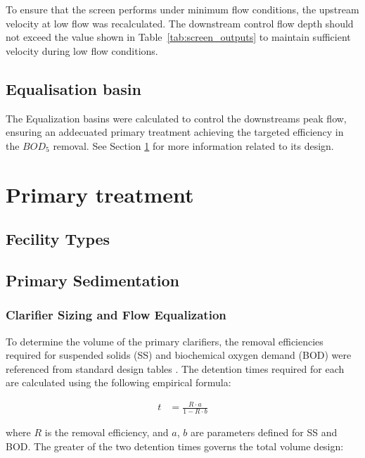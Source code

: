 \documentclass[12pt]{article}
\begin{document}
To ensure that the screen performs under minimum flow conditions, 
the upstream velocity at low flow was recalculated. The downstream control 
flow depth should not exceed the value shown in Table~\ref{tab:screen_outputs} to 
maintain sufficient velocity during low flow conditions.

\subsection{Equalisation basin}
\label{sec:equalization_basin}

The Equalization basins were calculated to control the downstreams peak flow, ensuring 
an addecuated primary treatment achieving the targeted efficiency in the $BOD_5$ 
removal. See Section \ref{sec:primary_treat} for more information related to its design.

\section{Primary treatment}
\label{sec:primary_treat}

\subsection{Fecility Types}
\label{sec:primary_facility_types}

\subsection{Primary Sedimentation}
\label{sec:primary_Sedimentation_design}

\subsubsection{Clarifier Sizing and Flow Equalization}

To determine the volume of the primary clarifiers, the removal efficiencies required for suspended solids (SS) and biochemical oxygen demand (BOD) were referenced from standard design tables \cite{metcalf_2014_wastewater}. The detention times required for each are calculated using the following empirical formula:

\begin{align}
t &= \frac{R \cdot a}{1 - R \cdot b}
\end{align}

where \( R \) is the removal efficiency, and \( a \), \( b \) are parameters defined for SS and BOD. The greater of the two detention times governs the total volume design:
\end{document}

